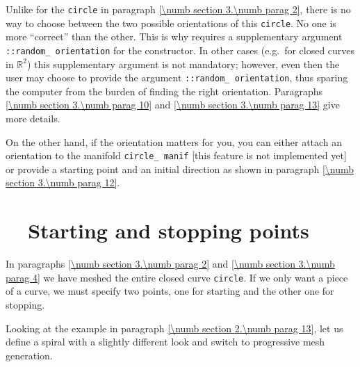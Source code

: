 Unlike for the {\small\tt circle} in paragraph \ref{\numb section 3.\numb parag 2},
there is no way to choose between the two possible orientations of this {\small\tt circle}.
No one is more ``correct'' than the other.
This is why {\maniFEM} requires a supplementary argument
{\small\tt {}::random\_\,orientation}
for the {\small\tt {}} constructor.
In other cases (e.g.\ for closed curves in $ \mathbb{R}^2 $) this supplementary argument
is not mandatory; however, even then the user may choose to provide the argument
{\small\tt {}::random\_\,orientation}, thus sparing the computer from the burden of
finding the right orientation.
Paragraphs \ref{\numb section 3.\numb parag 10} and \ref{\numb section 3.\numb parag 13}
give more details.

On the other hand, if the orientation matters for you, you can either attach an orientation
to the manifold {\small\tt circle\_\,manif} [this feature is not implemented yet]
or provide a starting point and an initial direction as shown in paragraph
\ref{\numb section 3.\numb parag 12}.


\section{~~Starting and stopping points}\label{\numb section 3.\numb parag 5}

In paragraphs \ref{\numb section 3.\numb parag 2} and \ref{\numb section 3.\numb parag 4}
we have meshed the entire closed curve {\small\tt circle}.
If we only want a piece of a curve, we must specify two points, one for starting and
the other one for stopping.

Looking at the example in paragraph \ref{\numb section 2.\numb parag 13}, let us define a
spiral with a slightly different look and switch to progressive mesh generation.

